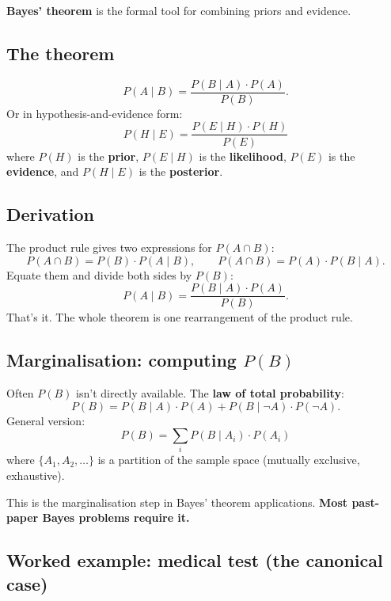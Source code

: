 \documentclass[11pt, a4paper]{article}
\begin{document}
\textbf{Bayes' theorem} is the formal tool for combining priors and evidence.

\subsection{The theorem}

\begin{defbox}
\[
P(A \mid B) = \frac{P(B \mid A) \cdot P(A)}{P(B)}.
\]
Or in hypothesis-and-evidence form:
\[
P(H \mid E) = \frac{P(E \mid H) \cdot P(H)}{P(E)}
\]
where $P(H)$ is the \textbf{prior}, $P(E \mid H)$ is the \textbf{likelihood}, $P(E)$ is the \textbf{evidence}, and $P(H \mid E)$ is the \textbf{posterior}.
\end{defbox}

\subsection{Derivation}

The product rule gives two expressions for $P(A \cap B)$:
\[
P(A \cap B) = P(B) \cdot P(A \mid B), \qquad P(A \cap B) = P(A) \cdot P(B \mid A).
\]
Equate them and divide both sides by $P(B)$:
\[
P(A \mid B) = \frac{P(B \mid A) \cdot P(A)}{P(B)}.
\]
That's it. The whole theorem is one rearrangement of the product rule.

\subsection{Marginalisation: computing $P(B)$}

Often $P(B)$ isn't directly available. The \textbf{law of total probability}:
\[
P(B) = P(B \mid A) \cdot P(A) + P(B \mid \neg A) \cdot P(\neg A).
\]
General version:
\[
P(B) = \sum_{i} P(B \mid A_i) \cdot P(A_i)
\]
where $\{A_1, A_2, \dots\}$ is a partition of the sample space (mutually exclusive, exhaustive).

This is the marginalisation step in Bayes' theorem applications. \textbf{Most past-paper Bayes problems require it.}

\subsection{Worked example: medical test (the canonical case)}
\end{document}

